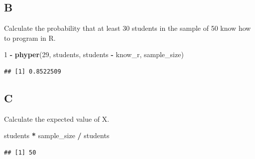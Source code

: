 \documentclass[
]{article}
\newenvironment{Shaded}{\begin{snugshade}}{\end{snugshade}}
\newcommand{\DecValTok}[1]{\textcolor[rgb]{0.00,0.00,0.81}{#1}}
\newcommand{\KeywordTok}[1]{\textcolor[rgb]{0.13,0.29,0.53}{\textbf{#1}}}
\newcommand{\NormalTok}[1]{#1}
\newcommand{\OperatorTok}[1]{\textcolor[rgb]{0.81,0.36,0.00}{\textbf{#1}}}
\newcommand{\StringTok}[1]{\textcolor[rgb]{0.31,0.60,0.02}{#1}}
\begin{document}
\hypertarget{b-4}{%
\subsection{B}\label{b-4}}

Calculate the probability that at least 30 students in the sample of 50
know how to program in R.

\begin{Shaded}
\begin{Highlighting}[]
\DecValTok{1} \OperatorTok{{-}}\StringTok{ }\KeywordTok{phyper}\NormalTok{(}\DecValTok{29}\NormalTok{, students, students }\OperatorTok{{-}}\StringTok{ }\NormalTok{know\_r, sample\_size)}
\end{Highlighting}
\end{Shaded}

\begin{verbatim}
## [1] 0.8522509
\end{verbatim}

\hypertarget{c-2}{%
\subsection{C}\label{c-2}}

Calculate the expected value of X.

\begin{Shaded}
\begin{Highlighting}[]
\NormalTok{students }\OperatorTok{*}\StringTok{ }\NormalTok{sample\_size }\OperatorTok{/}\StringTok{ }\NormalTok{students}
\end{Highlighting}
\end{Shaded}

\begin{verbatim}
## [1] 50
\end{verbatim}
\end{document}

